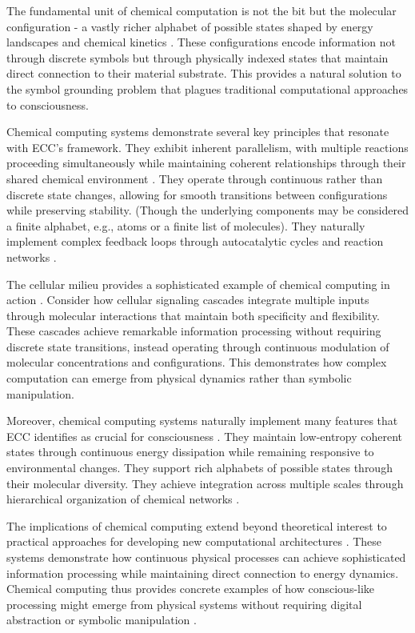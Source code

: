 \begin{refsection}
The fundamental unit of chemical computation is not the bit but the molecular configuration - a vastly richer alphabet of possible states shaped by energy landscapes and chemical kinetics \cite{Dittrich2018}. These configurations encode information not through discrete symbols but through physically indexed states that maintain direct connection to their material substrate. This provides a natural solution to the symbol grounding problem that plagues traditional computational approaches to consciousness.

Chemical computing systems demonstrate several key principles that resonate with ECC's framework. They exhibit inherent parallelism, with multiple reactions proceeding simultaneously while maintaining coherent relationships through their shared chemical environment \cite{Hjelmfelt1991}. They operate through continuous rather than discrete state changes, allowing for smooth transitions between configurations while preserving stability. (Though the underlying components may be considered a finite alphabet, e.g., atoms or a finite list of molecules). They naturally implement complex feedback loops through autocatalytic cycles and reaction networks \cite{Katz2012}.

The cellular milieu provides a sophisticated example of chemical computing in action \cite{Lehn2013}. Consider how cellular signaling cascades integrate multiple inputs through molecular interactions that maintain both specificity and flexibility. These cascades achieve remarkable information processing without requiring discrete state transitions, instead operating through continuous modulation of molecular concentrations and configurations. This demonstrates how complex computation can emerge from physical dynamics rather than symbolic manipulation.

Moreover, chemical computing systems naturally implement many features that ECC identifies as crucial for consciousness \cite{Magnasco1997}. They maintain low-entropy coherent states through continuous energy dissipation while remaining responsive to environmental changes. They support rich alphabets of possible states through their molecular diversity. They achieve integration across multiple scales through hierarchical organization of chemical networks \cite{Prakash2007}.

The implications of chemical computing extend beyond theoretical interest to practical approaches for developing new computational architectures \cite{Qian2011}. These systems demonstrate how continuous physical processes can achieve sophisticated information processing while maintaining direct connection to energy dynamics. Chemical computing thus provides concrete examples of how conscious-like processing might emerge from physical systems without requiring digital abstraction or symbolic manipulation \cite{Soloveichik2010}.


\end{refsection}
